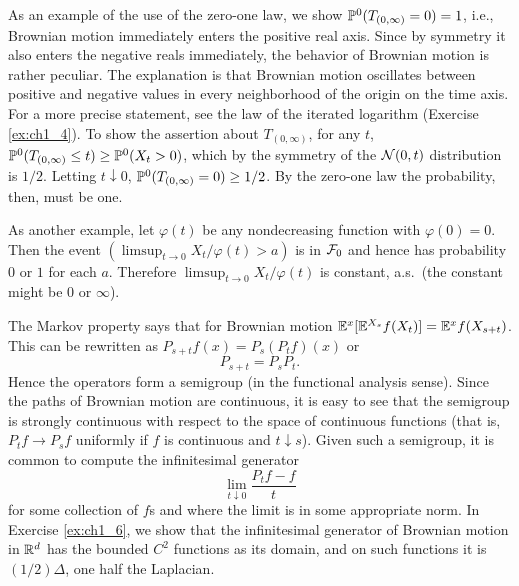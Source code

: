 As an example of the use of the zero-one law, we show $\P^0(T_{(0,\infty)} = 0) = 1$, i.e., Brownian motion immediately enters the positive real axis. Since by symmetry it also enters the negative reals immediately, the behavior of Brownian motion is rather peculiar. The explanation is that Brownian motion oscillates between positive and negative values in every neighborhood of the origin on the time axis. For a more precise statement, see the law of the iterated logarithm (Exercise \ref{ex:ch1_4}). To show the assertion about $T_{(0,\infty)}$, for any $t$, $\P^0(T_{(0,\infty)} \leq t) \geq \P^0(X_t > 0)$, which by the symmetry of the $\NC(0,t)$ distribution is $1/2$. Letting $t \downarrow 0$, $\P^0(T_{(0,\infty)} = 0) \geq 1/2$. By the zero-one law the probability, then, must be one.

As another example, let $\varphi(t)$ be any nondecreasing function with $\varphi(0) = 0$. Then the event $(\limsup_{t\to 0} X_t/\varphi(t) > a)$ is in $\FC_0$ and hence has probability $0$ or $1$ for each $a$. Therefore $\limsup_{t\to 0} X_t/\varphi(t)$ is constant, a.s.\ (the constant might be $0$ or $\infty$).


The Markov property says that for Brownian motion $\E^x[\E^{X_s}f(X_t)]= \E^xf(X_{s+t})$. This can be rewritten as $P_{s+t}f(x) = P_s(P_tf)(x)$ or
\begin{equation}\label{eq:ch1_3.4}
    P_{s+t} = P_sP_t.
\end{equation}
Hence the operators form a semigroup (in the functional analysis sense). Since the paths of Brownian motion are continuous, it is easy to see that the semigroup is strongly continuous with respect to the space of continuous functions (that is, $P_tf \to P_sf$ uniformly if $f$ is continuous and $t \downarrow s$). Given such a semigroup, it is common to compute the infinitesimal generator
\[
    \lim_{t\downarrow 0} \frac{P_tf - f}{t}
\]
for some collection of $f$s and where the limit is in some appropriate norm. In Exercise \ref{ex:ch1_6}, we show that the infinitesimal generator of Brownian motion in $\R^d$ has the bounded $C^2$ functions as its domain, and on such functions it is $(1/2)\Delta$, one half the Laplacian.

